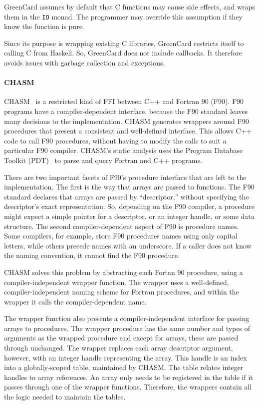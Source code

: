 GreenCard assumes by default that C functions may cause side effects, and wraps them in the \texttt{IO} monad. The programmer may override this assumption if they know the function is pure.

Since its purpose is wrapping existing C libraries, GreenCard restricts itself to calling C from Haskell. So, GreenCard does not include callbacks. It therefore avoids issues with garbage collection and exceptions.

\paragraph{CHASM}

CHASM~\cite{rasmussen01chasm} is a restricted kind of FFI between
C++ and Fortran 90 (F90). F90 programs have a compiler-dependent
interface, because the F90 standard leaves many decisions to the
implementation. CHASM generates wrappers around F90 procedures
that present a consistent and well-defined interface. This allows
C++ code to call F90 procedures, without having to modify the
calls to suit a particular F90 compiler. CHASM's static analysis
uses the Program Database Toolkit (PDT)~\cite{lindlan00analysis}
to parse and query Fortran and C++ programs.

There are two important facets of F90's procedure interface that
are left to the implementation. The first is the way that arrays
are passed to functions. The F90 standard declares that arrays are
passed by ``descriptor,'' without specifying the descriptor's
exact representation. So, depending on the F90 compiler, a
procedure might expect a simple pointer for a descriptor, or an
integer handle, or some data structure. The second
compiler-dependent aspect of F90 is procedure names. Some
compilers, for example, store F90 procedures names using only
capital letters, while others precede names with an underscore. If
a caller does not know the naming convention, it cannot find the
F90 procedure.

CHASM solves this problem by abstracting each Fortan 90 procedure,
using a compiler-independent wrapper function. The wrapper uses a
well-defined, compiler-independent naming scheme for Fortran
procedures, and within the wrapper it calls the compiler-dependent
name.

The wrapper function also presents a compiler-independent
interface for passing arrays to procedures. The wrapper procedure
has the same number and types of arguments as the wrapped
procedure and except for arrays, these are passed through
unchanged. The wrapper replaces each array descriptor argument,
however, with an integer handle representing the array. This
handle is an index into a globally-scoped table, maintained by
CHASM. The table relates integer handles to array references. An
array only needs to be registered in the table if it passes
through one of the wrapper functions. Therefore, the wrappers
contain all the logic needed to maintain the tables.

